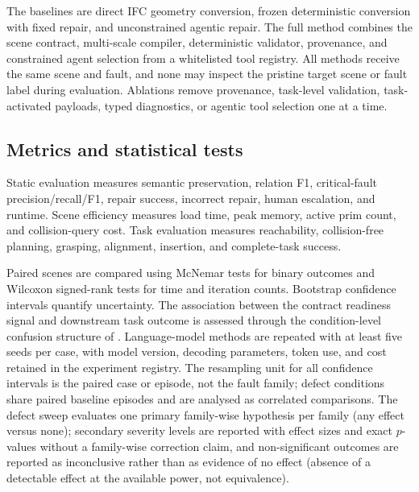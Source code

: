 The baselines are direct IFC geometry conversion, frozen deterministic
conversion with fixed repair, and unconstrained agentic repair. The full method
combines the scene contract, multi-scale compiler, deterministic validator,
provenance, and constrained agent selection from a whitelisted tool registry.
All methods receive the same scene and fault, and none may inspect the pristine
target scene or fault label during evaluation. Ablations remove provenance,
task-level validation, task-activated payloads, typed diagnostics, or agentic
tool selection one at a time.

\subsection{Metrics and statistical tests}

Static evaluation measures semantic preservation, relation F1, critical-fault
precision/recall/F1, repair success, incorrect repair, human escalation, and
runtime. Scene efficiency measures load time, peak memory, active prim count,
and collision-query cost. Task evaluation measures reachability,
collision-free planning, grasping, alignment, insertion, and complete-task
success.

Paired scenes are compared using McNemar tests for binary outcomes and
Wilcoxon signed-rank tests for time and iteration counts. Bootstrap confidence
intervals quantify uncertainty. The association between the contract readiness
signal and downstream task outcome is assessed through the condition-level
confusion structure of .
Language-model methods are repeated with at least five seeds per case, with
model version, decoding parameters, token use, and cost retained in the
experiment registry. The resampling unit for all confidence intervals is the
paired case or episode, not the fault family; defect conditions share paired
baseline episodes and are analysed as correlated comparisons. The defect sweep
evaluates one primary family-wise hypothesis per family (any effect versus
none); secondary severity levels are reported with effect sizes and exact
$p$-values without a family-wise correction claim, and non-significant
outcomes are reported as inconclusive rather than as evidence of no effect
(absence of a detectable effect at the available power, not equivalence).

